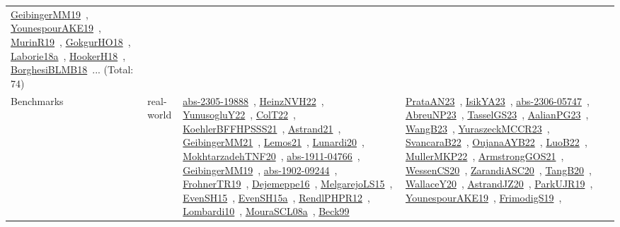 {\begin{longtable}{lp{3cm}>{\raggedright\arraybackslash}p{6cm}>{\raggedright\arraybackslash}p{6cm}>{\raggedright\arraybackslash}p{8cm}}
\href{works/GeibingerMM19.pdf}{GeibingerMM19}~\cite{GeibingerMM19}, \href{works/YounespourAKE19.pdf}{YounespourAKE19}~\cite{YounespourAKE19}, \href{works/MurinR19.pdf}{MurinR19}~\cite{MurinR19}, \href{works/GokgurHO18.pdf}{GokgurHO18}~\cite{GokgurHO18}, \href{works/Laborie18a.pdf}{Laborie18a}~\cite{Laborie18a}, \href{works/HookerH18.pdf}{HookerH18}~\cite{HookerH18}, \href{works/BorghesiBLMB18.pdf}{BorghesiBLMB18}~\cite{BorghesiBLMB18}... (Total: 74)\\
Benchmarks & real-world & \href{works/abs-2305-19888.pdf}{abs-2305-19888}~\cite{abs-2305-19888}, \href{works/HeinzNVH22.pdf}{HeinzNVH22}~\cite{HeinzNVH22}, \href{works/YunusogluY22.pdf}{YunusogluY22}~\cite{YunusogluY22}, \href{works/ColT22.pdf}{ColT22}~\cite{ColT22}, \href{works/KoehlerBFFHPSSS21.pdf}{KoehlerBFFHPSSS21}~\cite{KoehlerBFFHPSSS21}, \href{works/Astrand21.pdf}{Astrand21}~\cite{Astrand21}, \href{works/GeibingerMM21.pdf}{GeibingerMM21}~\cite{GeibingerMM21}, \href{works/Lemos21.pdf}{Lemos21}~\cite{Lemos21}, \href{works/Lunardi20.pdf}{Lunardi20}~\cite{Lunardi20}, \href{works/MokhtarzadehTNF20.pdf}{MokhtarzadehTNF20}~\cite{MokhtarzadehTNF20}, \href{works/abs-1911-04766.pdf}{abs-1911-04766}~\cite{abs-1911-04766}, \href{works/GeibingerMM19.pdf}{GeibingerMM19}~\cite{GeibingerMM19}, \href{works/abs-1902-09244.pdf}{abs-1902-09244}~\cite{abs-1902-09244}, \href{works/FrohnerTR19.pdf}{FrohnerTR19}~\cite{FrohnerTR19}, \href{works/Dejemeppe16.pdf}{Dejemeppe16}~\cite{Dejemeppe16}, \href{works/MelgarejoLS15.pdf}{MelgarejoLS15}~\cite{MelgarejoLS15}, \href{works/EvenSH15.pdf}{EvenSH15}~\cite{EvenSH15}, \href{works/EvenSH15a.pdf}{EvenSH15a}~\cite{EvenSH15a}, \href{works/RendlPHPR12.pdf}{RendlPHPR12}~\cite{RendlPHPR12}, \href{works/Lombardi10.pdf}{Lombardi10}~\cite{Lombardi10}, \href{works/MouraSCL08a.pdf}{MouraSCL08a}~\cite{MouraSCL08a}, \href{works/Beck99.pdf}{Beck99}~\cite{Beck99} & \href{works/PrataAN23.pdf}{PrataAN23}~\cite{PrataAN23}, \href{works/IsikYA23.pdf}{IsikYA23}~\cite{IsikYA23}, \href{works/abs-2306-05747.pdf}{abs-2306-05747}~\cite{abs-2306-05747}, \href{works/AbreuNP23.pdf}{AbreuNP23}~\cite{AbreuNP23}, \href{works/TasselGS23.pdf}{TasselGS23}~\cite{TasselGS23}, \href{works/AalianPG23.pdf}{AalianPG23}~\cite{AalianPG23}, \href{works/WangB23.pdf}{WangB23}~\cite{WangB23}, \href{works/YuraszeckMCCR23.pdf}{YuraszeckMCCR23}~\cite{YuraszeckMCCR23}, \href{works/SvancaraB22.pdf}{SvancaraB22}~\cite{SvancaraB22}, \href{works/OujanaAYB22.pdf}{OujanaAYB22}~\cite{OujanaAYB22}, \href{works/LuoB22.pdf}{LuoB22}~\cite{LuoB22}, \href{works/MullerMKP22.pdf}{MullerMKP22}~\cite{MullerMKP22}, \href{works/ArmstrongGOS21.pdf}{ArmstrongGOS21}~\cite{ArmstrongGOS21}, \href{works/WessenCS20.pdf}{WessenCS20}~\cite{WessenCS20}, \href{works/ZarandiASC20.pdf}{ZarandiASC20}~\cite{ZarandiASC20}, \href{works/TangB20.pdf}{TangB20}~\cite{TangB20}, \href{works/WallaceY20.pdf}{WallaceY20}~\cite{WallaceY20}, \href{works/AstrandJZ20.pdf}{AstrandJZ20}~\cite{AstrandJZ20}, \href{works/ParkUJR19.pdf}{ParkUJR19}~\cite{ParkUJR19}, \href{works/YounespourAKE19.pdf}{YounespourAKE19}~\cite{YounespourAKE19}, \href{works/FrimodigS19.pdf}{FrimodigS19}~\cite{FrimodigS19}, 
\end{longtable}}
